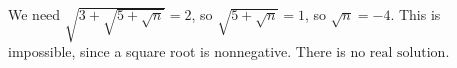 We need $\sqrt{3+\sqrt{5+\sqrt n}}=2$, so $\sqrt{5+\sqrt n}=1$, so $\sqrt n=-4$. This is impossible, since a square root is nonnegative. There is $\boxed{\text{no real solution}}$.
